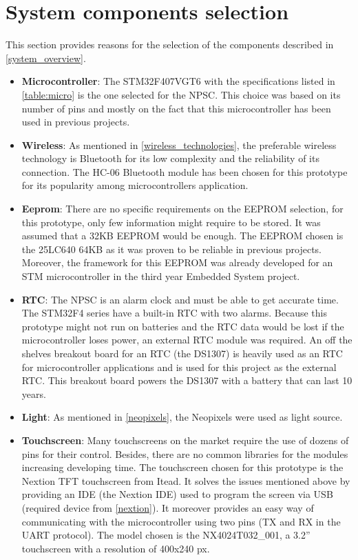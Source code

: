 \section{System components selection}
This section provides reasons for the selection of the components described in \ref{system_overview}.  
\begin{itemize}
\item \textbf{Microcontroller}: The STM32F407VGT6 with the specifications listed in \cref{table:micro} is the one selected for the NPSC. This choice was based on its number of pins and mostly on the fact that this microcontroller has been used in previous projects. 
\item \textbf{Wireless}: As mentioned in \ref{wireless_technologies}, the preferable wireless technology is Bluetooth for its low complexity and the reliability of its connection. The HC-06 Bluetooth module has been chosen for this prototype for its popularity among microcontrollers application.
\item \textbf{Eeprom}: There are no specific requirements on the EEPROM selection, for this prototype, only few information might require to be stored. It was assumed that a 32KB EEPROM would be enough. The EEPROM chosen is the 25LC640 64KB as it was proven to be reliable in previous projects. Moreover, the framework for this EEPROM was already developed for an STM microcontroller in the third year Embedded System project.  
\item \textbf{RTC}: The NPSC is an alarm clock and must be able to get accurate time. The STM32F4 series have a built-in RTC with two alarms. Because this prototype might not run on batteries and the RTC data would be lost if the microcontroller loses power, an external RTC module was required. An off the shelves breakout board for an RTC (the DS1307) is heavily used as an RTC for microcontroller applications and is used for this project as the external RTC. This breakout board powers the DS1307 with a battery that can last 10 years.
\item \textbf{Light}: As mentioned in \ref{neopixels}, the Neopixels were used as light source.
\item \textbf{Touchscreen}: Many touchscreens on the market require the use of dozens of pins for their control. Besides, there are no common libraries for the modules increasing developing time. The touchscreen chosen for this prototype is the Nextion TFT touchscreen from Itead. It solves the issues mentioned above by providing an IDE (the Nextion IDE) used to program the screen via USB (required device from \ref{nextion}). It moreover provides an easy way of communicating with the microcontroller using two pins (TX and RX in the UART protocol). The model chosen is the NX4024T032\_001, a 3.2'' touchscreen with a resolution of 400x240 px.
\end{itemize}

